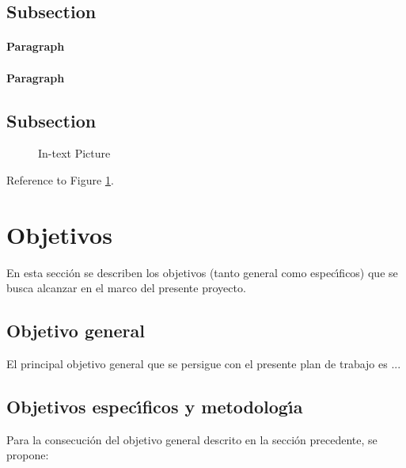 \documentclass[fleqn,10pt]{SelfArx} %
\begin{document}
\subsection{Subsection}

\lipsum[6] %

\paragraph{Paragraph} \lipsum[7] %
\paragraph{Paragraph} \lipsum[8] %

\subsection{Subsection}

\lipsum[9] %

\begin{figure}[ht]\centering
\caption{In-text Picture}
\label{fig:results}
\end{figure}

Reference to Figure \ref{fig:results}.


\section{Objetivos}

\indent En esta secci\'on se describen los objetivos (tanto general como espec\'\i ficos) que se busca alcanzar en el marco del presente proyecto. 

\subsection{Objetivo general}

\indent El principal objetivo general que se persigue con el presente plan de trabajo es ...

\subsection{Objetivos espec\'\i ficos y metodolog\'\i a}

\indent Para la consecuci\'on del objetivo general descrito en la secci\'on precedente, se propone:
\end{document}

